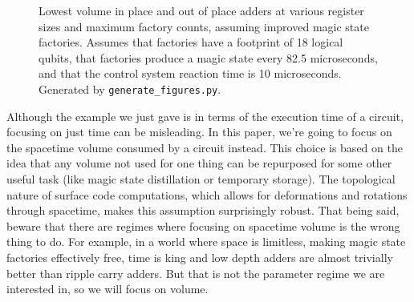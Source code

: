 \documentclass[onecolumn,unpublished]{quantumarticle}
\theoremstyle{definition}
\theoremstyle{definition}
\theoremstyle{definition}
\begin{document}
\begin{figure}[H]
    \centering
    \caption{
        Lowest volume in place and out of place adders at various register sizes and maximum factory counts, assuming improved magic state factories.
        Assumes that factories have a footprint of 18 logical qubits, that factories produce a magic state every 82.5 microseconds, and that the control system reaction time is 10 microseconds.
        Generated by \texttt{generate\_figures.py}.
    }
    \label{fig:minioh}
\end{figure}

Although the example we just gave is in terms of the execution time of a circuit, focusing on just time can be misleading.
In this paper, we're going to focus on the spacetime volume consumed by a circuit instead.
This choice is based on the idea that any volume not used for one thing can be repurposed for some other useful task (like magic state distillation or temporary storage).
The topological nature of surface code computations, which allows for deformations and rotations through spacetime, makes this assumption surprisingly robust.
That being said, beware that there are regimes where focusing on spacetime volume is the wrong thing to do.
For example, in a world where space is limitless, making magic state factories effectively free, time is king and low depth adders are almost trivially better than ripple carry adders.
But that is not the parameter regime we are interested in, so we will focus on volume.
\end{document}
